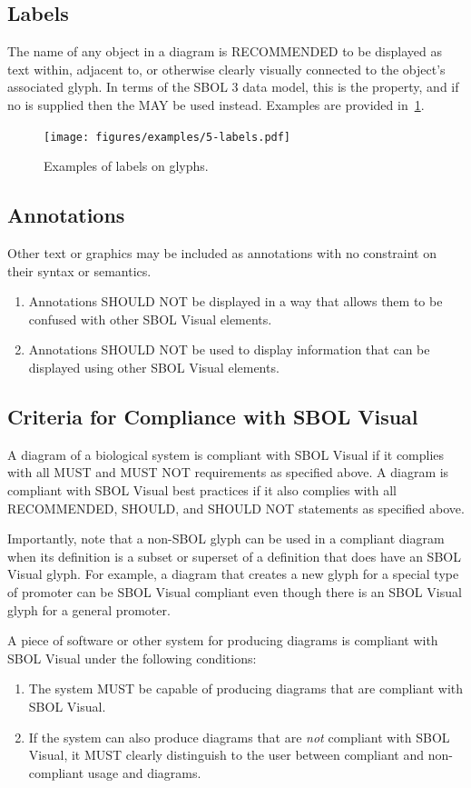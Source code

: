 \subsection{Labels}
The name of any object in a diagram is RECOMMENDED to be displayed as text within, adjacent to, or otherwise clearly visually connected to the object's associated glyph.  In terms of the SBOL 3 data model, this is the  property, and if no  is supplied then the  MAY be used instead.
Examples are provided in~\ref{exa:5}.

	\begin{figure}[h!]
	\centering
	\texttt{[image: figures/examples/5-labels.pdf]}
	\caption{Examples of labels on glyphs.}
	\label{exa:5}
	\end{figure}


\subsection{Annotations}
Other text or graphics may be included as annotations with no constraint on their syntax or semantics.

\begin{enumerate}
\item Annotations SHOULD NOT be displayed in a way that allows them to be confused with other SBOL Visual elements.
\item Annotations SHOULD NOT be used to display information that can be displayed using other SBOL Visual elements.
\end{enumerate}

\subsection{Criteria for Compliance with SBOL Visual}

A diagram of a biological system is compliant with SBOL Visual if it complies with all MUST and MUST NOT requirements as specified above.
A diagram is compliant with SBOL Visual best practices if it also complies with all RECOMMENDED, SHOULD, and SHOULD NOT statements as specified above.

Importantly, note that a non-SBOL glyph can be used in a compliant
diagram when its definition is a subset or superset of a definition that
does have an SBOL Visual glyph.  For example, a diagram that creates a
new glyph for a special type of promoter can be SBOL Visual compliant
even though there is an SBOL Visual glyph for a general promoter.

A piece of software or other system for producing diagrams is
compliant with SBOL Visual under the following conditions:
\begin{enumerate}
\item The system MUST be capable of producing diagrams that are
  compliant with SBOL Visual.
\item If the system can also produce diagrams that are {\em not}
  compliant with SBOL Visual, it MUST clearly distinguish to the user
  between compliant and non-compliant usage and diagrams.
\end{enumerate}

